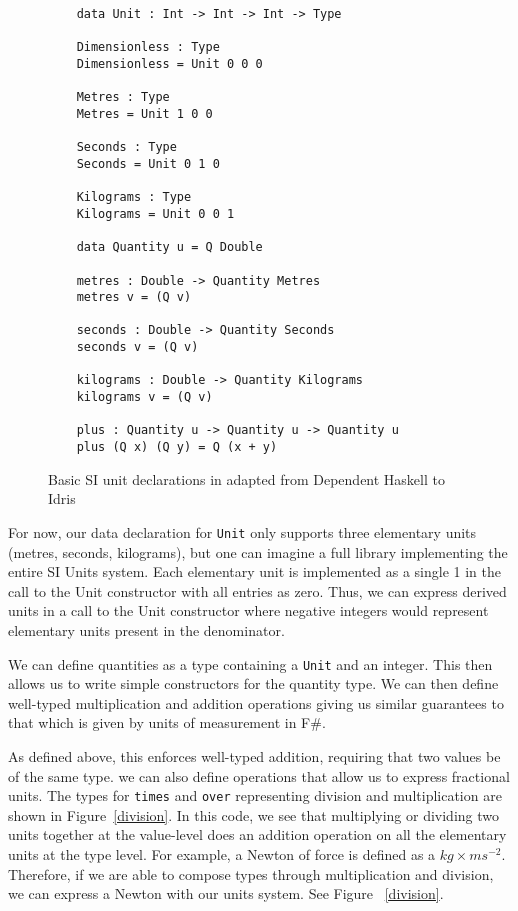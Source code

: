 \begin{figure}[ht!]
  \label{idris_code}
  \caption{Basic SI unit declarations in adapted from Dependent Haskell to Idris \protect\cite{gundry2013}}
  \begin{lstlisting}
    data Unit : Int -> Int -> Int -> Type
    
    Dimensionless : Type
    Dimensionless = Unit 0 0 0
    
    Metres : Type
    Metres = Unit 1 0 0
    
    Seconds : Type
    Seconds = Unit 0 1 0
    
    Kilograms : Type
    Kilograms = Unit 0 0 1
    
    data Quantity u = Q Double
    
    metres : Double -> Quantity Metres
    metres v = (Q v)
    
    seconds : Double -> Quantity Seconds
    seconds v = (Q v)
    
    kilograms : Double -> Quantity Kilograms
    kilograms v = (Q v)
    
    plus : Quantity u -> Quantity u -> Quantity u
    plus (Q x) (Q y) = Q (x + y)
  \end{lstlisting}
\end{figure}

For now, our data declaration for \texttt{Unit} only supports three elementary
units (metres, seconds, kilograms), but one can imagine a full library
implementing the entire SI Units system. Each elementary unit is implemented as
a single 1 in the call to the Unit constructor with all entries as zero. Thus,
we can express derived units in a call to the Unit constructor where negative
integers would represent elementary units present in the denominator. 

We can define quantities as a type containing a \texttt{Unit} and an integer.
This then allows us to write simple constructors for the quantity type. We can
then define well-typed multiplication and addition operations giving us similar
guarantees to that which is given by units of measurement in F\#. 

As defined above, this enforces well-typed addition, requiring that two
values be of the same type. we can also define operations that allow us to
express fractional units. The types for \texttt{times} and \texttt{over}
representing division and multiplication are shown in Figure~\ref{division}. In
this code, we see that multiplying or dividing two units together at the
value-level does an addition operation on all the elementary units at the type
level. For example, a Newton of force is defined as a $kg\times ms^{-2}$.
Therefore, if we are able to compose types through multiplication and division,
we can express a Newton with our units system. See Figure ~\ref{division}. 

